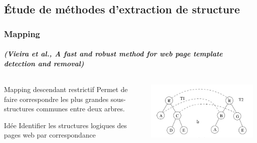 \documentclass[9pt]{beamer}
\begin{document}
\subsection{Étude de méthodes d'extraction de structure}
\begin{frame}
\frametitle{Mapping}
\framesubtitle{\textit{(Vieira et al., A fast and robust method for web page template detection and removal)}}
\begin{columns}
	\begin{column}{5cm}
	\begin{block}{Mapping descendant restrictif}
		Permet de faire correspondre les plus grandes sous-structures communes entre deux arbres.\\
	\end{block}
	\begin{block}{Idée}
		Identifier les structures logiques des pages web par correspondance
	\end{block}
	\end{column}
	\begin{column}{5cm}
		\includegraphics[scale=0.3]{img/mapping.jpg}
	\end{column}
\end{columns}
\end{frame}
\end{document}
